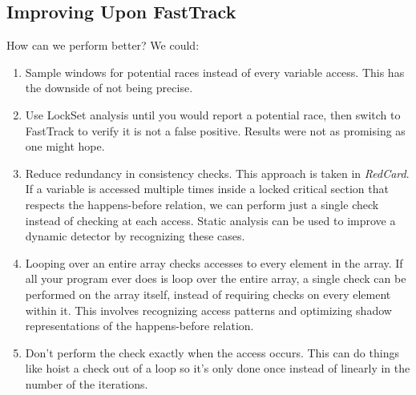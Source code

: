 \documentclass[twoside]{article}
\begin{document}
\subsection{Improving Upon FastTrack}
How can we perform better? We could:
\begin{enumerate}
    \item Sample windows for potential races instead of every variable access.
        This has the downside of not being precise.
    \item Use LockSet analysis until you would report a potential race, then
        switch to FastTrack to verify it is not a false positive. Results were
        not as promising as one might hope.
    \item Reduce redundancy in consistency checks. This approach is taken in
        \emph{RedCard}. If a variable is accessed multiple times inside a locked
        critical section that respects the happens-before relation, we can
        perform just a single check instead of checking at each access. Static
        analysis can be used to improve a dynamic detector by recognizing these
        cases.
    \item Looping over an entire array checks accesses to every element in the
        array. If all your program ever does is loop over the entire array, a
        single check can be performed on the array itself, instead of requiring
        checks on every element within it. This involves recognizing access
        patterns and optimizing shadow representations of the happens-before
        relation.
    \item Don't perform the check exactly when the access occurs. This can do
        things like hoist a check out of a loop so it's only done once instead
        of linearly in the number of the iterations.
\end{enumerate}
\end{document}

